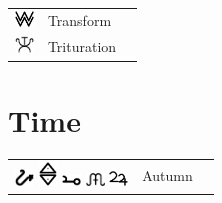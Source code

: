 \documentclass[british,final,landscape]{scrartcl}
\begin{document}
\begin{refsection}
\begin{supertabular}{p{0.3\textwidth}p{0.34\textwidth}p{0.34\textwidth}}
   \includegraphics[width=5mm]{Process/Transform} & Transform & \\
   \includegraphics[width=5mm]{Process/Triturate} & Trituration & \\
  \end{supertabular}

\section{Time}

 \tablelasttail{\bottomrule}
 \begin{supertabular}{p{0.3\textwidth}p{0.34\textwidth}p{0.34\textwidth}}
   \includegraphics[width=5mm]{Time/Autumn} \includegraphics[width=5mm]{Time/Autumn2} \includegraphics[width=5mm]{Time/Autumn3} \includegraphics[width=5mm]{Time/Autumn4} \includegraphics[width=5mm]{Time/Autumn5} & Autumn & \\

\end{supertabular}
\end{refsection}
\end{document}

